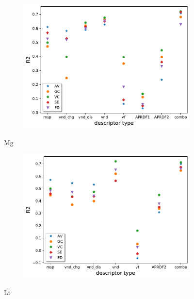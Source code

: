  \begin{figure}[h]
    \centering
    \begin{subfigure}{1\textwidth}
        \centering
        \includegraphics[width=\linewidth]{result/figures/Mg_pred_on_targ.pdf}
    \end{subfigure}
        \caption{Mg}
        \label{fig:predontarg_Mg}
\end{figure}    

\begin{figure}[h]
    \centering
  \begin{subfigure}{1\textwidth}
        \centering
        \includegraphics[width=\linewidth]{result/figures/Li_pred_on_targ.pdf}
    \end{subfigure}%
        \caption{Li}
        \label{fig:predontarg_Li}
\end{figure}

